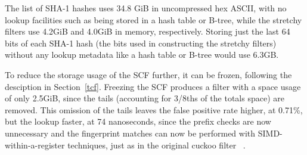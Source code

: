 \documentclass[letterpaper,twocolumn,10pt]{article}
\newcommand{\taffy}{stretchy}
\newcommand{\TBF}{SBF}
\newcommand{\TCF}{SCF}
\newcommand{\MTCF}{MSCF}
\newcommand{\taffy}{taffy}
\newcommand{\TBF}{TBF}
\newcommand{\TCF}{TCF}
\newcommand{\MTCF}{MTCF}
\begin{document}
The list of SHA-1 hashes uses 34.8 GiB in uncompressed hex ASCII, with no lookup facilities such as being stored in a hash table or B-tree, while the \taffy{} filters use 4.2GiB and 4.0GiB in memory, respectively.
Storing just the last 64 bits of each SHA-1 hash (the bits used in constructing the \taffy{} filters) without any lookup metadata like a hash table or B-tree would use 6.3GB.

To reduce the storage usage of the \TCF{} further, it can be frozen, following the desciption in Section~\ref{tcf}.
Freezing the \TCF{} produces a filter with a space usage of only 2.5GiB, since the tails (accounting for 3/8ths of the totals space) are removed.
This omission of the tails leaves the false positive rate higher, at 0.71\%, but the lookup faster, at 74 nanoseconds, since the prefix checks are now unnecessary and the fingerprint matches can now be performed with SIMD-within-a-register techniques, just as in the original cuckoo filter ~\cite{cuckoo-filter-github}.




\end{document}

